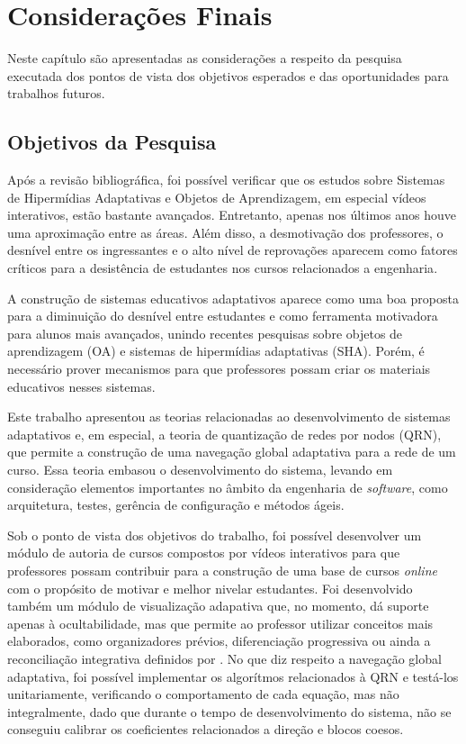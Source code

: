 \chapter[Considerações Finais]{Considerações Finais}

Neste capítulo são apresentadas as considerações a respeito da pesquisa executada dos pontos de vista dos objetivos esperados e das oportunidades para trabalhos futuros.

\section{Objetivos da Pesquisa}

Após a revisão bibliográfica, foi possível verificar que os estudos sobre Sistemas de Hipermídias Adaptativas e Objetos de Aprendizagem, em especial vídeos interativos, estão bastante avançados. Entretanto, apenas nos últimos anos houve uma aproximação entre as áreas. Além disso, a desmotivação dos professores, o desnível entre os ingressantes e o alto nível de reprovações aparecem como fatores críticos para a desistência de estudantes nos cursos relacionados a engenharia\cite{silva2005}. 

A construção de sistemas educativos adaptativos aparece como uma boa proposta para a diminuição do desnível entre estudantes e como ferramenta motivadora para alunos mais avançados, unindo recentes pesquisas sobre objetos de aprendizagem (OA) e sistemas de hipermídias adaptativas (SHA). Porém, é necessário prover mecanismos para que professores possam criar os materiais educativos nesses sistemas.

Este trabalho apresentou as teorias relacionadas ao desenvolvimento de sistemas adaptativos e, em especial, a teoria de quantização de redes por nodos (QRN), que permite a construção de uma navegação global adaptativa para a rede de um curso. Essa teoria embasou o desenvolvimento do sistema, levando em consideração elementos importantes no âmbito da engenharia de \textit{software}, como arquitetura, testes, gerência de configuração e métodos ágeis. 

Sob o ponto de vista dos objetivos do trabalho, foi possível desenvolver um módulo de autoria de cursos compostos por vídeos interativos para que professores possam contribuir para a construção de uma base de cursos \textit{online} com o propósito de motivar e melhor nivelar estudantes. Foi desenvolvido também um módulo de visualização adapativa que, no momento, dá suporte apenas à ocultabilidade, mas que permite ao professor utilizar conceitos mais elaborados, como organizadores prévios, diferenciação progressiva ou ainda a reconciliação integrativa definidos por . No que diz respeito a navegação global adaptativa, foi possível implementar os algorítmos relacionados à QRN e testá-los unitariamente, verificando o comportamento de cada equação, mas não integralmente, dado que durante o tempo de desenvolvimento do sistema, não se conseguiu calibrar os coeficientes relacionados a direção e blocos coesos. 


